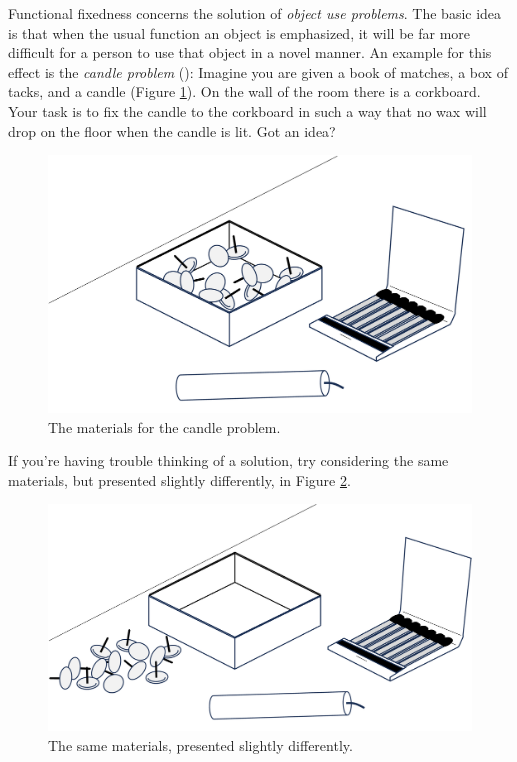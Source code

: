 \documentclass[
]{krantz}
\begin{document}
Functional fixedness concerns the solution of \emph{object use problems}. The basic idea is that when the usual function an object is emphasized, it will be far more difficult for a person to use that object in a novel manner. An example for this effect is the \emph{candle problem} (): Imagine you are given a book of matches, a box of tacks, and a candle (Figure \ref{fig:candle1}). On the wall of the room there is a corkboard. Your task is to fix the candle to the corkboard in such a way that no wax will drop on the floor when the candle is lit. Got an idea?

\begin{figure}

{\centering \includegraphics[width=0.6\linewidth]{images/ch10/candle1} 

}

\caption{The materials for the candle problem.}\label{fig:candle1}
\end{figure}

If you're having trouble thinking of a solution, try considering the same materials, but presented slightly differently, in Figure \ref{fig:candle2}.

\begin{figure}

{\centering \includegraphics[width=0.6\linewidth]{images/ch10/candle2} 

}

\caption{The same materials, presented slightly differently.}\label{fig:candle2}
\end{figure}
\end{document}
